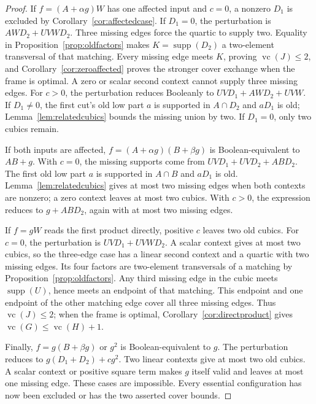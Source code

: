 \documentclass[11pt]{article}
\newcommand{\supp}{\operatorname{supp}}
\newcommand{\vc}{\operatorname{vc}}
\theoremstyle{definition}
\theoremstyle{remark}
\begin{document}
\begin{proof}
If $f=(A+\alpha g)W$ has one affected input and $c=0$, a nonzero $D_1$ is excluded by Corollary~\ref{cor:affectedcase}. If $D_1=0$, the perturbation is $AWD_2+UVWD_2$. Three missing edges force the quartic to supply two. Equality in Proposition~\ref{prop:oldfactors} makes $K=\supp(D_2)$ a two-element transversal of that matching. Every missing edge meets $K$, proving $\vc(J)\le2$, and Corollary~\ref{cor:zeroaffected} proves the stronger cover exchange when the frame is optimal. A zero or scalar second context cannot supply three missing edges. For $c>0$, the perturbation reduces Booleanly to $UVD_1+AWD_2+UVW$. If $D_1\ne0$, the first cut's old low part $a$ is supported in $A\cap D_2$ and $aD_1$ is old; Lemma~\ref{lem:relatedcubics} bounds the missing union by two. If $D_1=0$, only two cubics remain.

If both inputs are affected, $f=(A+\alpha g)(B+\beta g)$ is Boolean-equivalent to $AB+g$. With $c=0$, the missing supports come from $UVD_1+UVD_2+ABD_2$. The first old low part $a$ is supported in $A\cap B$ and $aD_1$ is old. Lemma~\ref{lem:relatedcubics} gives at most two missing edges when both contexts are nonzero; a zero context leaves at most two cubics. With $c>0$, the expression reduces to $g+ABD_2$, again with at most two missing edges.

If $f=gW$ reads the first product directly, positive $c$ leaves two old cubics. For $c=0$, the perturbation is $UVD_1+UVWD_2$. A scalar context gives at most two cubics, so the three-edge case has a linear second context and a quartic with two missing edges. Its four factors are two-element transversals of a matching by Proposition~\ref{prop:oldfactors}. Any third missing edge in the cubic meets $\supp(U)$, hence meets an endpoint of that matching. This endpoint and one endpoint of the other matching edge cover all three missing edges. Thus $\vc(J)\le2$; when the frame is optimal, Corollary~\ref{cor:directproduct} gives $\vc(G)\le\vc(H)+1$.

Finally, $f=g(B+\beta g)$ or $g^2$ is Boolean-equivalent to $g$. The perturbation reduces to $g(D_1+D_2)+c g^2$. Two linear contexts give at most two old cubics. A scalar context or positive square term makes $g$ itself valid and leaves at most one missing edge. These cases are impossible. Every essential configuration has now been excluded or has the two asserted cover bounds.
\end{proof}
\end{document}
